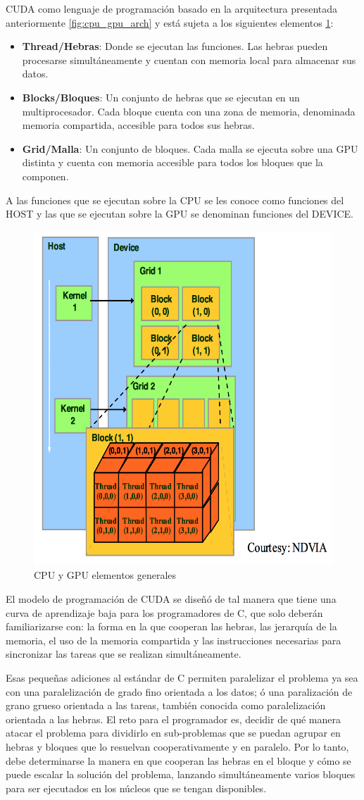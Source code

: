 CUDA como lenguaje de programación basado en la arquitectura presentada
anteriormente \ref{fig:cpu_gpu_arch} y está sujeta a los siguientes elementos
\ref{fig:cpu_gpu_elements}:
\begin{itemize}
 \item \textbf{Thread/Hebras}: Donde se ejecutan las funciones. Las hebras pueden
 procesarse simultáneamente y cuentan con memoria local para almacenar sus
 datos.
 \item \textbf{Blocks/Bloques}: Un conjunto de hebras que se ejecutan en un
 multiprocesador. Cada bloque cuenta con una zona de memoria, denominada
 memoria compartida, accesible para todos sus hebras.
 \item \textbf{Grid/Malla}:  Un conjunto de bloques. Cada malla se ejecuta sobre una
 GPU distinta y cuenta con memoria accesible para todos los bloques que la
 componen.
\end{itemize}

A las funciones que se ejecutan sobre la CPU se les conoce como funciones del 
HOST y las que se ejecutan sobre la GPU se denominan funciones del DEVICE.

\begin{figure}[h]
    \centering
    \includegraphics[height=0.5\textwidth]{images/elements.png}
    \caption{CPU y GPU elementos generales}
    \label{fig:cpu_gpu_elements}
\end{figure}

El modelo de programación de CUDA se diseñó de tal manera que tiene una curva
de aprendizaje baja para los programadores de C, que solo deberán
familiarizarse con: la forma en la que cooperan las hebras, las jerarquía de la
memoria, el uso de la memoria compartida y las instrucciones necesarias para
sincronizar las tareas que se realizan simultáneamente.

Esas pequeñas adiciones al estándar de C permiten paralelizar el problema ya
sea con una paralelización de grado fino orientada a los datos; ó una
paralización de grano grueso orientada a las tareas, también conocida como
paralelización orientada a las hebras. El reto para el programador es, decidir
de qué manera atacar el problema para dividirlo en sub-problemas que se puedan
agrupar en hebras y bloques que lo resuelvan cooperativamente y en paralelo.
Por lo tanto, debe determinarse la manera en que cooperan las hebras en el
bloque y cómo se puede escalar la solución del problema, lanzando
simultáneamente varios bloques para ser ejecutados en los núcleos que se tengan
disponibles.

